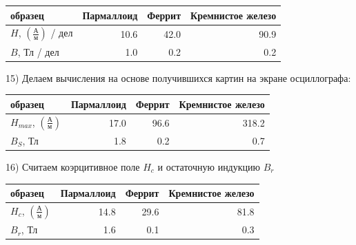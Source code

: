 \documentclass[a4paper,12pt]{extarticle}
\begin{document}
\begin{center}
    \begin{tabular}{|l|r|r|r|}
        \hline
        образец & \multicolumn{1}{l|}{Пармаллоид} & \multicolumn{1}{l|}{Феррит} & \multicolumn{1}{l|}{Кремнистое железо} \\ \hline
        $H$, $\left( \frac{\text{А}}{\text{м}} \right)$ / дел       & 10.6                            & 42.0                        & 90.9                                   \\ \hline
        $B$, Тл / дел       & 1.0                             & 0.2                         & 0.2                                    \\ \hline
    \end{tabular}
\end{center}
15) Делаем вычисления на основе получившихся картин на экране осциллографа: 
\begin{center}
    \begin{tabular}{|l|r|r|r|}
        \hline
        образец & \multicolumn{1}{l|}{Пармаллоид} & \multicolumn{1}{l|}{Феррит} & \multicolumn{1}{l|}{Кремнистое железо} \\ \hline
        $H_{max}$, $\left( \frac{\text{А}}{\text{м}} \right)$      & 17.0                            & 96.6                        & 318.2                                   \\ \hline
        $B_S$, Тл       & 1.8                             & 0.2                         & 0.7                                    \\ \hline
    \end{tabular}
\end{center}
16) Считаем коэрцитивное поле $H_c$ и остаточную индукцию $B_r$
\begin{center}
    \begin{tabular}{|l|r|r|r|}
        \hline
        образец & \multicolumn{1}{l|}{Пармаллоид} & \multicolumn{1}{l|}{Феррит} & \multicolumn{1}{l|}{Кремнистое железо} \\ \hline
        $H_{c}$, $\left( \frac{\text{А}}{\text{м}} \right)$      & 14.8                            & 29.6                        & 81.8                                   \\ \hline
        $B_r$, Тл       & 1.6                             & 0.1                         & 0.3                                    \\ \hline
    \end{tabular}
\end{center}
\end{document}
